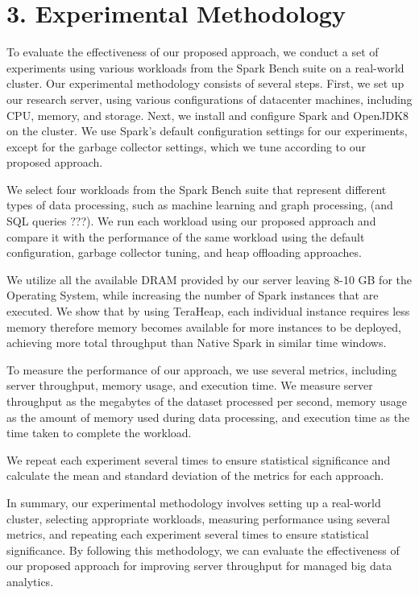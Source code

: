 \documentclass[twocolumn,10pt]{asme2e}
\begin{document}
\section*{3. Experimental Methodology}

To evaluate the effectiveness of our proposed approach, we conduct a set of experiments using various workloads from the Spark Bench suite on a real-world cluster. Our experimental methodology consists of several steps. First, we set up our research server, using various configurations of datacenter machines, including CPU, memory, and storage. Next, we install and configure Spark and OpenJDK8 on the cluster. We use Spark's default configuration settings for our experiments, except for the garbage collector settings, which we tune according to our proposed approach.

We select four workloads from the Spark Bench suite that represent different types of data processing, such as machine learning and graph processing, (and SQL queries ???). We run each workload using our proposed approach and compare it with the performance of the same workload using the default configuration, garbage collector tuning, and heap offloading approaches.

We utilize all the available DRAM provided by our server leaving 8-10 GB for the Operating System, while increasing the number of Spark instances that are executed. We show that by using TeraHeap, each individual instance requires less memory therefore memory becomes available for more instances to be deployed, achieving more total throughput than Native Spark in similar time windows.

To measure the performance of our approach, we use several metrics, including server throughput, memory usage, and execution time. We measure server throughput as the megabytes of the dataset processed per second, memory usage as the amount of memory used during data processing, and execution time as the time taken to complete the workload.

We repeat each experiment several times to ensure statistical significance and calculate the mean and standard deviation of the metrics for each approach.

In summary, our experimental methodology involves setting up a real-world cluster, selecting appropriate workloads, measuring performance using several metrics, and repeating each experiment several times to ensure statistical significance. By following this methodology, we can evaluate the effectiveness of our proposed approach for improving server throughput for managed big data analytics.
\end{document}

